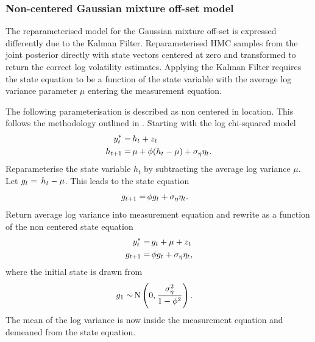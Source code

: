 \documentclass[12pt, a4paper]{article}
\begin{document}
        \subsubsection{Non-centered Gaussian mixture off-set model}
        The reparameterised model for the Gaussian mixture off-set is expressed differently due to the Kalman Filter. Reparameterised HMC samples from the joint posterior directly with state vectors centered at zero and transformed to return the correct log volatility estimates. Applying the Kalman Filter requires the state equation to be a function of the state variable with the average log variance parameter $\mu$ entering the measurement equation.

        The following parameterisation is described as non centered in location. This follows the methodology outlined in \citet{strickland2008parameterisation}. Starting with the log chi-squared model
        \begin{align}
        y^{\ast}_t =& \space \, h_t + z_t \\
        h_{t+1} =& \space \, \mu +\phi(h_t - \mu) + \sigma_{\eta} \eta_t.
        \end{align}
        Reparameterise the state variable $h_t$ by subtracting the average log variance $\mu$. Let $g_t = \space \, h_t - \mu$. This leads to the state equation
        \begin{align}
        g_{t+1} =& \space \, \phi g_t + \sigma_{\eta}\eta_{t}.
        \end{align}
        Return average log variance into measurement equation and rewrite as a function of the non centered state equation
        \begin{align}
        y^{\ast}_t =& \space \, g_t + \mu + z_t \\
        g_{t+1} =& \space \, \phi g_t + \sigma_{\eta}\eta_{t},
        \end{align}
        where the initial state is drawn from 
        \begin{align}
            g_1 \sim& \space \,\mathrm{N}\left(0, \frac{\sigma_{\eta}^2}{1-\phi^2}\right).
        \end{align}
        The mean of the log variance is now inside the measurement equation and demeaned from the state equation.
    
\end{document}
